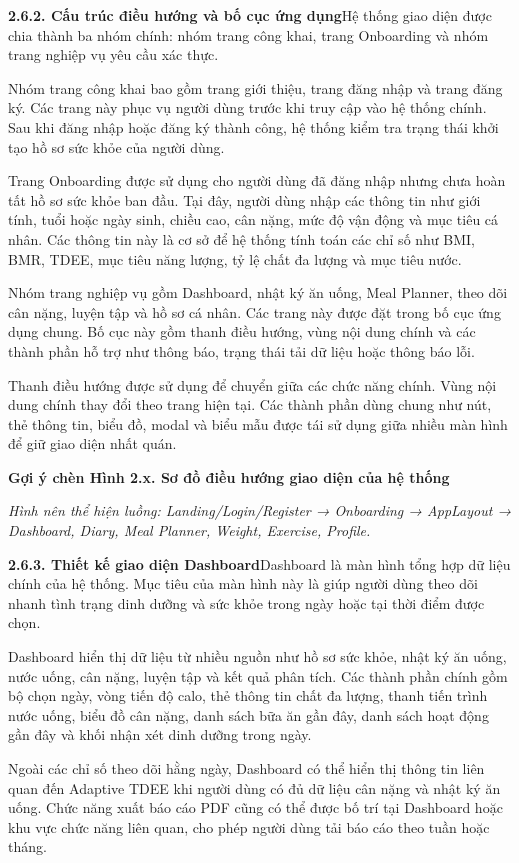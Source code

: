 \textbf{2.6.2. Cấu trúc điều hướng và bố cục ứng dụng}Hệ thống giao diện được chia thành ba nhóm chính: nhóm trang công khai, trang Onboarding và nhóm trang nghiệp vụ yêu cầu xác thực.

Nhóm trang công khai bao gồm trang giới thiệu, trang đăng nhập và trang đăng ký. Các trang này phục vụ người dùng trước khi truy cập vào hệ thống chính. Sau khi đăng nhập hoặc đăng ký thành công, hệ thống kiểm tra trạng thái khởi tạo hồ sơ sức khỏe của người dùng.

Trang Onboarding được sử dụng cho người dùng đã đăng nhập nhưng chưa hoàn tất hồ sơ sức khỏe ban đầu. Tại đây, người dùng nhập các thông tin như giới tính, tuổi hoặc ngày sinh, chiều cao, cân nặng, mức độ vận động và mục tiêu cá nhân. Các thông tin này là cơ sở để hệ thống tính toán các chỉ số như BMI, BMR, TDEE, mục tiêu năng lượng, tỷ lệ chất đa lượng và mục tiêu nước.

Nhóm trang nghiệp vụ gồm Dashboard, nhật ký ăn uống, Meal Planner, theo dõi cân nặng, luyện tập và hồ sơ cá nhân. Các trang này được đặt trong bố cục ứng dụng chung. Bố cục này gồm thanh điều hướng, vùng nội dung chính và các thành phần hỗ trợ như thông báo, trạng thái tải dữ liệu hoặc thông báo lỗi.

Thanh điều hướng được sử dụng để chuyển giữa các chức năng chính. Vùng nội dung chính thay đổi theo trang hiện tại. Các thành phần dùng chung như nút, thẻ thông tin, biểu đồ, modal và biểu mẫu được tái sử dụng giữa nhiều màn hình để giữ giao diện nhất quán.

\textbf{Gợi ý chèn Hình 2.x. Sơ đồ điều hướng giao diện của hệ thống}

\textit{Hình nên thể hiện luồng: Landing/Login/Register → Onboarding → AppLayout → Dashboard, Diary, Meal Planner, Weight, Exercise, Profile.}

\textbf{2.6.3. Thiết kế giao diện Dashboard}Dashboard là màn hình tổng hợp dữ liệu chính của hệ thống. Mục tiêu của màn hình này là giúp người dùng theo dõi nhanh tình trạng dinh dưỡng và sức khỏe trong ngày hoặc tại thời điểm được chọn.

Dashboard hiển thị dữ liệu từ nhiều nguồn như hồ sơ sức khỏe, nhật ký ăn uống, nước uống, cân nặng, luyện tập và kết quả phân tích. Các thành phần chính gồm bộ chọn ngày, vòng tiến độ calo, thẻ thông tin chất đa lượng, thanh tiến trình nước uống, biểu đồ cân nặng, danh sách bữa ăn gần đây, danh sách hoạt động gần đây và khối nhận xét dinh dưỡng trong ngày.

Ngoài các chỉ số theo dõi hằng ngày, Dashboard có thể hiển thị thông tin liên quan đến Adaptive TDEE khi người dùng có đủ dữ liệu cân nặng và nhật ký ăn uống. Chức năng xuất báo cáo PDF cũng có thể được bố trí tại Dashboard hoặc khu vực chức năng liên quan, cho phép người dùng tải báo cáo theo tuần hoặc tháng.


